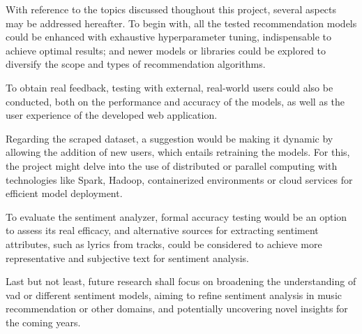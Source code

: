 With reference to the topics discussed thoughout this project, several aspects may be addressed hereafter. To begin with, all the tested recommendation models could be enhanced with exhaustive hyperparameter tuning, indispensable to achieve optimal results; and newer models or libraries could be explored to diversify the scope and types of recommendation algorithms.

To obtain real feedback, testing with external, real-world users could also be conducted, both on the performance and accuracy of the models, as well as the user experience of the developed web application.

Regarding the scraped dataset, a suggestion would be making it dynamic by allowing the addition of new users, which entails retraining the models. For this, the project might delve into the use of distributed or parallel computing with technologies like Spark, Hadoop, containerized environments or cloud services for efficient model deployment.

To evaluate the sentiment analyzer, formal accuracy testing would be an option to assess its real efficacy, and alternative sources for extracting sentiment attributes, such as lyrics from tracks, could be considered to achieve more representative and subjective text for sentiment analysis.

Last but not least, future research shall focus on broadening the understanding of \acs{vad} or different sentiment models, aiming to refine sentiment analysis in music recommendation or other domains, and potentially uncovering novel insights for the coming years.
